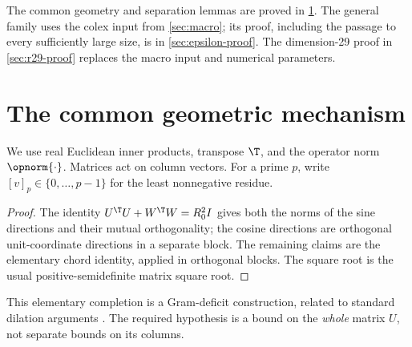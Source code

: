 The common geometry and separation lemmas are proved in
\cref{sec:mechanism}. The general family uses the colex input from
\cref{sec:macro}; its proof, including the passage to every sufficiently
large size, is in \cref{sec:epsilon-proof}. The dimension-29 proof in
\cref{sec:r29-proof} replaces the macro input and numerical parameters.

\section{The common geometric mechanism}\label{sec:mechanism}

We use real Euclidean inner products, transpose $\T$, and the operator norm
$\opnorm{\cdot}$. Matrices act on column vectors. For a prime $p$, write
$[v]_p\in\{0,\ldots,p-1\}$ for the least nonnegative residue.

\begin{proof}
The identity $U^\T U+W^\T W=R_0^2I$ gives both the norms of the sine
directions and their mutual orthogonality; the cosine directions are
orthogonal unit-coordinate directions in a separate block. The remaining
claims are the elementary chord identity, applied in orthogonal blocks.
The square root is the usual positive-semidefinite matrix square root.
\end{proof}

This elementary completion is a Gram-deficit construction, related to
standard dilation arguments \cite{Robinson}. The required hypothesis is a
bound on the \emph{whole} matrix $U$, not separate bounds on its columns.

